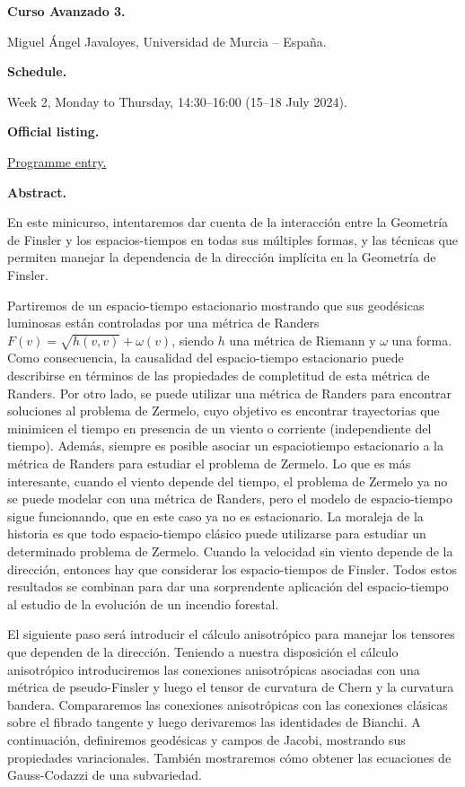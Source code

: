 \medskip\noindent
{\bf Curso Avanzado 3.}

Miguel Ángel Javaloyes,
Universidad de Murcia -- España.

\medskip\noindent
{\bf Schedule.}

Week 2, Monday to Thursday, 14:30--16:00
(15--18 July 2024).

\medskip\noindent
{\bf Official listing.}

\href{%
https://naturales.ues.edu.sv/%
ecimpasv2024/advanced-curse-3/}{%
Programme entry.}

\medskip\noindent
{\bf Abstract.}

En este minicurso, intentaremos dar cuenta de
la interacción entre la Geometría de Finsler
y los espacios-tiempos en todas sus múltiples
formas, y las técnicas que permiten manejar
la dependencia de la dirección implícita en
la Geometría de Finsler.

Partiremos de un espacio-tiempo estacionario
mostrando que sus geodésicas luminosas están
controladas por una métrica de Randers
$F(v)=\sqrt{h(v,v)}+\omega(v)$, siendo $h$
una métrica de Riemann y $\omega$ una forma.
Como consecuencia, la causalidad del
espacio-tiempo estacionario puede describirse
en términos de las propiedades de completitud
de esta métrica de Randers. Por otro lado, se
puede utilizar una métrica de Randers para
encontrar soluciones al problema de Zermelo,
cuyo objetivo es encontrar trayectorias que
minimicen el tiempo en presencia de un viento
o corriente (independiente del tiempo).
Además, siempre es posible asociar un
espaciotiempo estacionario a la métrica de
Randers para estudiar el problema de Zermelo.
Lo que es más interesante, cuando el viento
depende del tiempo, el problema de Zermelo ya
no se puede modelar con una métrica de
Randers, pero el modelo de espacio-tiempo
sigue funcionando, que en este caso ya no es
estacionario. La moraleja de la historia es
que todo espacio-tiempo clásico puede
utilizarse para estudiar un determinado
problema de Zermelo. Cuando la velocidad sin
viento depende de la dirección, entonces hay
que considerar los espacio-tiempos de
Finsler. Todos estos resultados se combinan
para dar una sorprendente aplicación del
espacio-tiempo al estudio de la evolución de
un incendio forestal.

El siguiente paso será introducir el cálculo
anisotrópico para manejar los tensores que
dependen de la dirección. Teniendo a nuestra
disposición el cálculo anisotrópico
introduciremos las conexiones anisotrópicas
asociadas con una métrica de pseudo-Finsler y
luego el tensor de curvatura de Chern y la
curvatura bandera. Compararemos las
conexiones anisotrópicas con las conexiones
clásicas sobre el fibrado tangente y luego
derivaremos las identidades de Bianchi. A
continuación, definiremos geodésicas y campos
de Jacobi, mostrando sus propiedades
variacionales. También mostraremos cómo
obtener las ecuaciones de Gauss-Codazzi de
una subvariedad.

